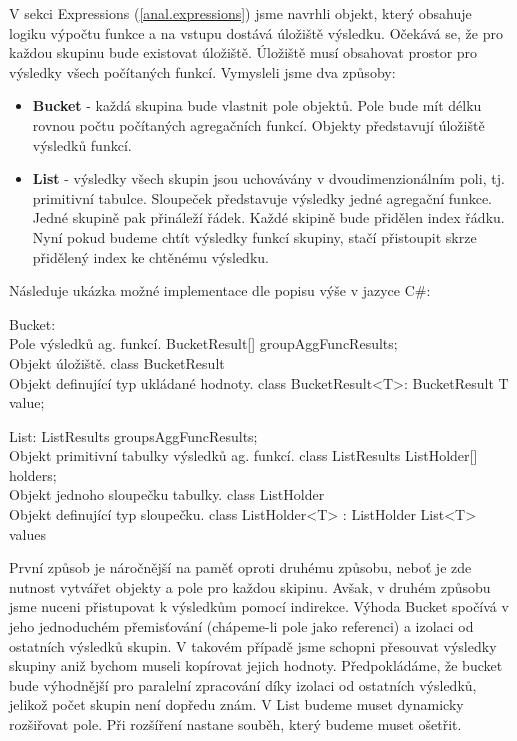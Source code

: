 V sekci Expressions (\ref{anal.expressions}) jsme navrhli objekt, který obsahuje logiku výpočtu funkce a na vstupu dostává úložiště výsledku.
Očekává se, že pro každou skupinu bude existovat úložiště.
Úložiště musí obsahovat prostor pro výsledky všech počítaných funkcí.
Vymysleli jsme dva způsoby:

\begin{itemize}

\item \textbf{Bucket} - každá skupina bude vlastnit pole objektů. 
Pole bude mít délku rovnou počtu počítaných agregačních funkcí.
Objekty představují úložiště výsledků funkcí.

\item \textbf{List} - výsledky všech skupin jsou uchovávány v dvoudimenzionálním poli, tj. primitivní tabulce.
Sloupeček představuje výsledky jedné agregační funkce.
Jedné skupině pak přináleží řádek.
Každé skipině bude přidělen index řádku.
Nyní pokud budeme chtít výsledky funkcí skupiny, stačí přistoupit skrze přidělený index ke chtěnému výsledku.
\end{itemize}

Následuje ukázka možné implementace dle popisu výše v jazyce C\#:
\begin{code}
Bucket:
\\ Pole výsledků ag. funkcí.
BucketResult[] groupAggFuncResults; 
\\ Objekt úložiště. 
class BucketResult {} 
\\ Objekt definující typ ukládané hodnoty.
class BucketResult<T>: BucketResult { T value; }

List:
ListResults groupsAggFuncResults;
\\ Objekt primitivní tabulky výsledků ag. funkcí.
class ListResults { ListHolder[] holders; }
\\ Objekt jednoho sloupečku tabulky.
class ListHolder {}
\\ Objekt definující typ sloupečku.
class ListHolder<T> : ListHolder { List<T> values }
\end{code}

První způsob je náročnější na paměť oproti druhému způsobu, neboť je zde nutnost vytvářet objekty a pole pro každou skipinu.
Avšak, v druhém způsobu jsme nuceni přistupovat k výsledkům pomocí indirekce.
Výhoda Bucket spočívá v jeho jednoduchém přemisťování (chápeme-li pole jako referenci) a izolaci od ostatních výsledků skupin.
V takovém případě jsme schopni přesouvat výsledky skupiny aniž bychom museli kopírovat jejich hodnoty.
Předpokládáme, že bucket bude výhodnější pro paralelní zpracování díky izolaci od ostatních výsledků, jelikož počet skupin není dopředu znám.
V List budeme muset dynamicky rozšiřovat pole.
Při rozšíření nastane souběh, který budeme muset ošetřit.

